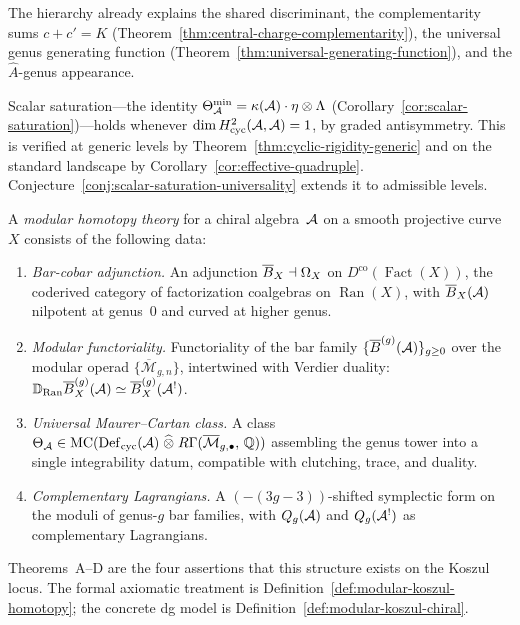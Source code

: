The hierarchy already explains the shared discriminant, the
complementarity sums $c + c' = K$
(Theorem~\ref{thm:central-charge-complementarity}), the universal
genus generating function
(Theorem~\ref{thm:universal-generating-function}), and the
$\hat{A}$-genus appearance.

Scalar saturation---the identity
$\Theta_{\mathcal{A}}^{\min} = \kappa(\mathcal{A}) \cdot \eta \otimes \Lambda$
(Corollary~\ref{cor:scalar-saturation})---holds whenever
$\dim H^2_{\mathrm{cyc}}(\mathcal{A},\mathcal{A}) = 1$, by graded antisymmetry.
This is verified at generic levels by
Theorem~\ref{thm:cyclic-rigidity-generic} and on the standard
landscape by Corollary~\ref{cor:effective-quadruple}.
Conjecture~\ref{conj:scalar-saturation-universality} extends it
to admissible levels.

\begin{definition}
\label{def:modular-homotopy-theory-intro}
A \emph{modular homotopy theory} for a chiral algebra~$\mathcal{A}$
on a smooth projective curve~$X$ consists of the following data:
\begin{enumerate}[label=\textup{(\roman*)}]
\item \emph{Bar-cobar adjunction.}
  An adjunction
  $\overline{B}_X \dashv \Omega_X$ on
  $D^{\mathrm{co}}(\operatorname{Fact}(X))$, the coderived
  category of factorization coalgebras on
  $\operatorname{Ran}(X)$, with $\overline{B}_X(\mathcal{A})$ nilpotent at
  genus~$0$ and curved at higher genus.
\item \emph{Modular functoriality.}
  Functoriality of the bar family
  $\{\overline{B}^{(g)}(\mathcal{A})\}_{g \geq 0}$ over the modular operad
  $\{\overline{\mathcal{M}}_{g,n}\}$, intertwined with Verdier
  duality:
  $\mathbb{D}_{\operatorname{Ran}}\overline{B}^{(g)}_X(\mathcal{A})
  \simeq \overline{B}^{(g)}_X(\mathcal{A}^!)$.
\item \emph{Universal Maurer--Cartan class.}
  A class
  $\Theta_{\mathcal{A}} \in
  \operatorname{MC}(\operatorname{Def}_{\mathrm{cyc}}(\mathcal{A})
  \;\widehat{\otimes}\;
  R\Gamma(\overline{\mathcal{M}}_{g,\bullet},\,
  \mathbb{Q}))$
  assembling the genus tower into a single integrability datum,
  compatible with clutching, trace, and duality.
\item \emph{Complementary Lagrangians.}
  A $(-(3g{-}3))$-shifted symplectic form on the moduli of
  genus-$g$ bar families, with
  $Q_g(\mathcal{A})$ and $Q_g(\mathcal{A}^!)$ as complementary Lagrangians.
\end{enumerate}
Theorems~A--D are the four assertions that this structure exists on the
Koszul locus.  The formal axiomatic treatment is
Definition~\ref{def:modular-koszul-homotopy}; the concrete dg model is
Definition~\ref{def:modular-koszul-chiral}.
\end{definition}


